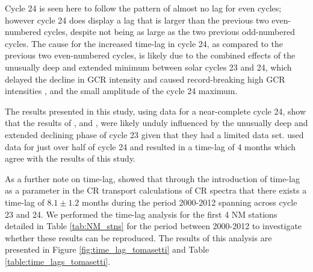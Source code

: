 Cycle 24 is seen here to follow the pattern of almost no lag for even cycles; however cycle 24 does display a lag that is larger than the previous two even-numbered cycles, despite not being as large as the two previous odd-numbered cycles. The cause for the increased time-lag in cycle 24, as compared to the previous two even-numbered cycles, is likely due to the combined effects of the unusually deep and extended minimum between solar cycles 23 and 24, which delayed the decline in GCR intensity and caused record-breaking high GCR intensities \citep{pacini_unusual_2015}, and the small amplitude of the cycle 24 maximum.

The results presented in this study, using data for a near-complete cycle 24, show that the results of \cite{kane_lags_2014}, and \cite{mishra_study_2016}, were likely unduly influenced by the unusually deep and extended declining phase of cycle 23 given that they had a limited data set. \cite{mishra_study_2016} used data for just over half of cycle 24 and resulted in a time-lag of 4 months which agree with the results of this study.

As a further note on time-lag, \cite{tomassetti_evidence_2017} showed that through the introduction of time-lag as a parameter in the CR transport calculations of CR spectra that there exists a time-lag of $8.1 \pm 1.2$ months during the period 2000-2012 spanning across cycle 23 and 24. We performed the time-lag analysis for the first 4 NM stations detailed in Table \ref{tab:NM_stns} for the period between 2000-2012 to investigate whether these results can be reproduced. The results of this analysis are presented in Figure \ref{fig:time_lag_tomasetti} and Table \ref{table:time_lags_tomasetti}.


